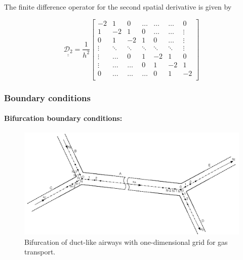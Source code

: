 The finite difference operator for the second spatial derivative is given by

\begin{equation}
\underline{\underline{\mathcal{D}_2}} = \frac{1}{h^2}
\left[\begin{array}{ccccccc} -2 &  1 &  0 & \dots & \dots & \dots & 0 \\
                              1 & -2 & 1 & 0 & \dots & \dots & \vdots  \\
                              0 &  1 & -2 & 1 & 0 & \dots & \vdots  \\
                              \vdots & \ddots & \ddots & \ddots & \ddots & \ddots & \vdots \\
                              \vdots  & \dots & 0 & 1 & -2 & 1 & 0 \\
                              \vdots & \dots & \dots & 0 & 1 & -2 & 1 \\
                              0 & \dots & \dots & \dots & 0 & 1 & -2 \\\end{array}\right]
\end{equation}

\subsubsection{Boundary conditions}
\paragraph{Bifurcation boundary conditions:}

\begin{figure}[b!]
\centering
\includegraphics[width=\textwidth]{figures/bifurcation_nodecentered}
\caption{Bifurcation of duct-like airways with one-dimensional grid for gas transport.}
\label{fig:bifurcation}
\end{figure}

